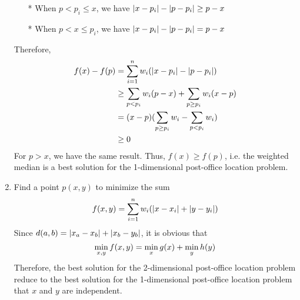 \begin{enumerate}
\begin{itemize}
			\item[*]	When $p < p_i \leq x$, we have $\left\lvert x - p_i \right\rvert - \left\lvert p - p_i \right\rvert \geq p - x$
			\item[*]	When $p < x \leq p_i$, we have $\left\lvert x - p_i \right\rvert - \left\lvert p - p_i \right\rvert = p - x$
		\end{itemize}
		Therefore,
		\begin{equation} \notag
		\begin{aligned}
			f(x) - f(p) & = \sum_{i = 1}^n w_i(\left\lvert x - p_i \right\rvert - \left\lvert p - p_i \right\rvert) \\
					& \geq \sum_{p < p_i} w_i(p - x) + \sum_{p \geq p_i} w_i(x - p) \\
					& = (x - p)(\sum_{p \geq p_i} w_i - \sum_{p < p_i} w_i) \\
					& \geq 0
		\end{aligned}
		\end{equation}
		For $p > x$, we have the same result. Thus, $f(x) \geq f(p)$, i.e. the weighted median is a best solution for the 1-dimensional post-office location problem.
	\item	Find a point $p(x, y)$ to minimize the sum
		\begin{equation} \notag
			f(x, y) = \sum_{i = 1}^n w_i(\left\lvert x - x_i \right\rvert + \left\lvert y - y_i \right\rvert)
		\end{equation}
		Since $d(a, b) = \left\lvert x_a - x_b \right\rvert + \left\lvert x_b - y_b \right\rvert$, it is obvious that
		\begin{equation} \notag
			\min_{x, y} f(x, y) = \min_x g(x) + \min_y h(y)
		\end{equation}
		Therefore, the best solution for the 2-dimensional post-office location problem reduce to the best solution for the 1-dimensional post-office location problem that $x$ and $y$ are independent.
\end{enumerate}

